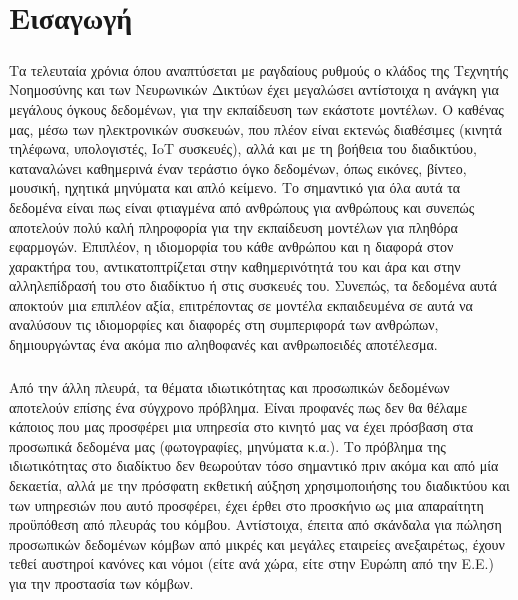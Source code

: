\chapter{Εισαγωγή}
\vspace{-0.5cm}
\paragraph{}Τα τελευταία χρόνια όπου αναπτύσεται με ραγδαίους ρυθμούς ο κλάδος της Τεχνητής Νοημοσύνης και των Νευρωνικών Δικτύων έχει μεγαλώσει αντίστοιχα η ανάγκη για μεγάλους όγκους δεδομένων, για την εκπαίδευση των εκάστοτε μοντέλων. Ο καθένας μας, μέσω των ηλεκτρονικών συσκευών, που πλέον είναι εκτενώς διαθέσιμες (κινητά τηλέφωνα, υπολογιστές, IoT συσκευές), αλλά και με τη βοήθεια του διαδικτύου, καταναλώνει καθημερινά έναν τεράστιο όγκο δεδομένων, όπως εικόνες, βίντεο, μουσική, ηχητικά μηνύματα και απλό κείμενο. Το σημαντικό για όλα αυτά τα δεδομένα είναι πως είναι φτιαγμένα από ανθρώπους για ανθρώπους και συνεπώς αποτελούν πολύ καλή πληροφορία για την εκπαίδευση μοντέλων για πληθόρα εφαρμογών. Επιπλέον, η ιδιομορφία του κάθε ανθρώπου και η διαφορά στον χαρακτήρα του, αντικατοπτρίζεται στην καθημερινότητά του και άρα και στην αλληλεπίδρασή του στο διαδίκτυο ή στις συσκευές του. Συνεπώς, τα δεδομένα αυτά αποκτούν μια επιπλέον αξία, επιτρέποντας σε μοντέλα εκπαιδευμένα σε αυτά να αναλύσουν τις ιδιομορφίες και διαφορές στη συμπεριφορά των ανθρώπων, δημιουργώντας ένα ακόμα πιο αληθοφανές και ανθρωποειδές αποτέλεσμα. 
\vspace{-1cm}
\paragraph{}Από την άλλη πλευρά, τα θέματα ιδιωτικότητας και προσωπικών δεδομένων αποτελούν επίσης ένα σύγχρονο πρόβλημα. Είναι προφανές πως δεν θα θέλαμε κάποιος που μας προσφέρει μια υπηρεσία στο κινητό μας να έχει πρόσβαση στα προσωπικά δεδομένα μας (φωτογραφίες, μηνύματα κ.α.). Το πρόβλημα της ιδιωτικότητας στο διαδίκτυο δεν θεωρούταν τόσο σημαντικό πριν ακόμα και από μία δεκαετία, αλλά με την πρόσφατη εκθετική αύξηση χρησιμοποιήσης του διαδικτύου και των υπηρεσιών που αυτό προσφέρει, έχει έρθει στο προσκήνιο ως μια απαραίτητη προϋπόθεση από πλευράς του κόμβου. Αντίστοιχα, έπειτα από σκάνδαλα για πώληση προσωπικών δεδομένων κόμβων από μικρές και μεγάλες εταιρείες ανεξαιρέτως, έχουν τεθεί αυστηροί κανόνες και νόμοι (είτε ανά χώρα, είτε στην Ευρώπη από την Ε.Ε.) για την προστασία των κόμβων.
\vspace{-1cm}
